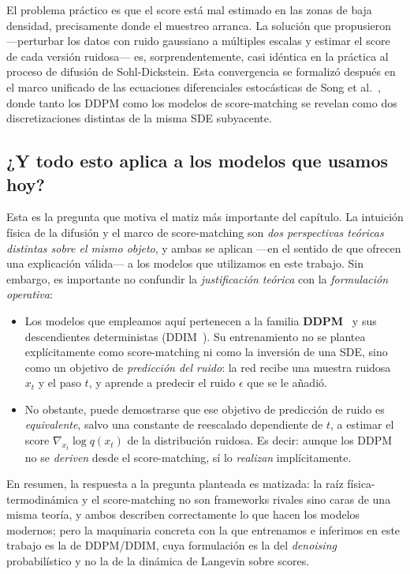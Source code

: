 El problema práctico es que el score está mal estimado en las zonas de
baja densidad, precisamente donde el muestreo arranca. La solución que
propusieron —perturbar los datos con ruido gaussiano a múltiples
escalas y estimar el score de cada versión ruidosa— es,
sorprendentemente, casi idéntica en la práctica al proceso de
difusión de Sohl-Dickstein. Esta convergencia se formalizó después en
el marco unificado de las ecuaciones diferenciales estocásticas de
Song et al.~\cite{song2021sde}, donde tanto los DDPM como los modelos
de score-matching se revelan como dos discretizaciones distintas de la
misma SDE subyacente.

\subsection{¿Y todo esto aplica a los modelos que usamos hoy?}
\label{subsec:aplica-hoy}

Esta es la pregunta que motiva el matiz más importante del capítulo.
La intuición física de la difusión y el marco de score-matching son
\emph{dos perspectivas teóricas distintas sobre el mismo objeto}, y
ambas se aplican —en el sentido de que ofrecen una explicación
válida— a los modelos que utilizamos en este trabajo. Sin embargo, es
importante no confundir la \emph{justificación teórica} con la
\emph{formulación operativa}:

\begin{itemize}
    \item Los modelos que empleamos aquí pertenecen a la familia
    \textbf{DDPM}~\cite{ho2020ddpm} y sus descendientes
    deterministas (DDIM~\cite{song2021ddim}). Su entrenamiento no se
    plantea explícitamente como score-matching ni como la inversión
    de una SDE, sino como un objetivo de \emph{predicción del ruido}:
    la red recibe una muestra ruidosa $x_t$ y el paso $t$, y aprende
    a predecir el ruido $\epsilon$ que se le añadió.
    \item No obstante, puede demostrarse que ese objetivo de
    predicción de ruido es \emph{equivalente}, salvo una constante de
    reescalado dependiente de $t$, a estimar el score
    $\nabla_{x_t}\log q(x_t)$ de la distribución ruidosa. Es decir:
    aunque los DDPM no se \emph{deriven} desde el score-matching, sí
    lo \emph{realizan} implícitamente.
\end{itemize}

En resumen, la respuesta a la pregunta planteada es matizada: la raíz
física-termodinámica y el score-matching no son frameworks rivales
sino caras de una misma teoría, y ambos describen correctamente lo que
hacen los modelos modernos; pero la maquinaria concreta con la que
entrenamos e inferimos en este trabajo es la de DDPM/DDIM, cuya
formulación es la del \emph{denoising} probabilístico y no la de la
dinámica de Langevin sobre scores.

